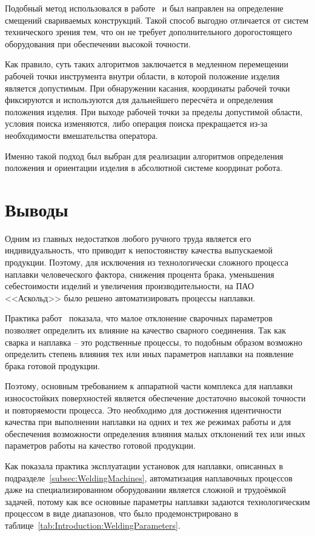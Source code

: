 Подобный метод использовался в работе~\cite{Fei_Gao_2015} и был направлен на определение смещений свариваемых конструкций.
Такой способ выгодно отличается от систем технического зрения тем, что он не требует дополнительного дорогостоящего оборудования при обеспечении высокой точности.

Как правило, суть таких алгоритмов заключается в медленном перемещении рабочей точки инструмента внутри области, в которой положение изделия является допустимым.
При обнаружении касания, координаты рабочей точки фиксируются и используются для дальнейшего пересчёта и определения положения изделия.
При выходе рабочей точки за пределы допустимой области, условия поиска изменяются, либо операция поиска прекращается из-за необходимости вмешательства оператора.

Именно такой подход был выбран для реализации алгоритмов определения положения и ориентации изделия в абсолютной системе координат робота.


\section{Выводы}
Одним из главных недостатков любого ручного труда является его индивидуальность, что приводит к непостоянству качества выпускаемой продукции.
Поэтому, для исключения из технологически сложного процесса наплавки человеческого фактора, снижения процента брака, уменьшения себестоимости изделий и увеличения производительности, на ПАО <<Аскольд>> было решено автоматизировать процессы наплавки.

Практика работ~\cite{Al_Sarraf_2016, Dai_2011, Gwan_Hyung_Kim, Liang_2011, Lin_2018, Xu_2008} показала, что малое отклонение сварочных параметров позволяет определить их влияние на качество сварного соединения.
Так как сварка и наплавка -- это родственные процессы, то подобным образом возможно определить степень влияния тех или иных параметров наплавки на появление брака готовой продукции.

Поэтому, основным требованием к аппаратной части комплекса для наплавки износостойких поверхностей является обеспечение достаточно высокой точности и повторяемости процесса.
Это необходимо для достижения идентичности качества при выполнении наплавки на одних и тех же режимах работы и для обеспечения возможности определения влияния малых отклонений тех или иных параметров работы на качество готовой продукции.

Как показала практика эксплуатации установок для наплавки, описанных в подразделе~\ref{subsec:WeldingMachines}, автоматизация наплавочных процессов даже на специализированном оборудовании является сложной и трудоёмкой задачей, потому как все основные параметры наплавки задаются технологическим процессом в виде диапазонов, что было продемонстрировано в таблице~\ref{tab:Introduction:WeldingParameters}.

